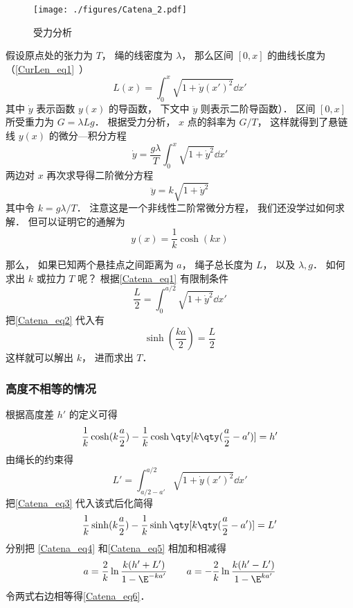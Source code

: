 
\begin{figure}[ht]
\centering
\texttt{[image: ./figures/Catena\_2.pdf]}
\caption{受力分析} \label{Catena_fig2}
\end{figure}
假设原点处的张力为 $T$， 绳的线密度为 $\lambda$， 那么区间 $[0, x]$ 的曲线长度为（\autoref{CurLen_eq1}~）
\begin{equation}\label{Catena_eq1}
L(x) = \int_0^x \sqrt{1 + \dot y(x')^2} \dd{x'}
\end{equation}
其中 $\dot y$ 表示函数 $y(x)$ 的导函数， 下文中 $\ddot y$ 则表示二阶导函数）． 区间 $[0, x]$ 所受重力为 $G = \lambda L g$． 根据受力分析， $x$ 点的斜率为 $G/T$， 这样就得到了悬链线 $y(x)$ 的微分—积分方程
\begin{equation}
\dot y = \frac{g\lambda}{T} \int_0^x \sqrt{1 + \dot y^2} \dd{x'}
\end{equation}
两边对 $x$ 再次求导得二阶微分方程
\begin{equation}
\ddot y = k \sqrt{1 + \dot y^2}
\end{equation}
其中令 $k = g\lambda/T$． 注意这是一个非线性二阶常微分方程， 我们还没学过如何求解． 但可以证明它的通解为
\begin{equation}\label{Catena_eq2}
y(x) = \frac{1}{k}\cosh(kx)
\end{equation}

那么， 如果已知两个悬挂点之间距离为 $a$， 绳子总长度为 $L$， 以及 $\lambda, g$． 如何求出 $k$ 或拉力 $T$ 呢？ 根据\autoref{Catena_eq1} 有限制条件
\begin{equation}
\frac{L}{2} = \int_0^{a/2} \sqrt{1 + \dot y^2} \dd{x'}
\end{equation}
把\autoref{Catena_eq2} 代入有
\begin{equation}
\sinh(\frac{ka}{2}) = \frac{L}{2}
\end{equation}
这样就可以解出 $k$， 进而求出 $T$．

\subsubsection{高度不相等的情况}
根据高度差 $h'$ 的定义可得
\begin{equation}\label{Catena_eq4}
\frac{1}{k}\cosh(k\frac{a}{2}) - \frac{1}{k}\cosh\qty[k\qty(\frac{a}{2}-a')] = h'
\end{equation}
由绳长的约束得
\begin{equation}
L' = \int_{a/2-a'}^{a/2} \sqrt{1 + \dot y(x')^2} \dd{x'}
\end{equation}
把\autoref{Catena_eq3} 代入该式后化简得
\begin{equation}\label{Catena_eq5}
\frac{1}{k}\sinh(k\frac{a}{2}) - \frac{1}{k}\sinh\qty[k\qty(\frac{a}{2}-a')] = L'
\end{equation}
分别把 \autoref{Catena_eq4} 和\autoref{Catena_eq5} 相加和相减得
\begin{equation}
a = \frac{2}{k} \ln\frac{k(h'+L')}{1 - \E^{-ka'}}
\qquad
a = -\frac{2}{k} \ln\frac{k(h'-L')}{1 - \E^{ka'}}
\end{equation}
令两式右边相等得\autoref{Catena_eq6}．
